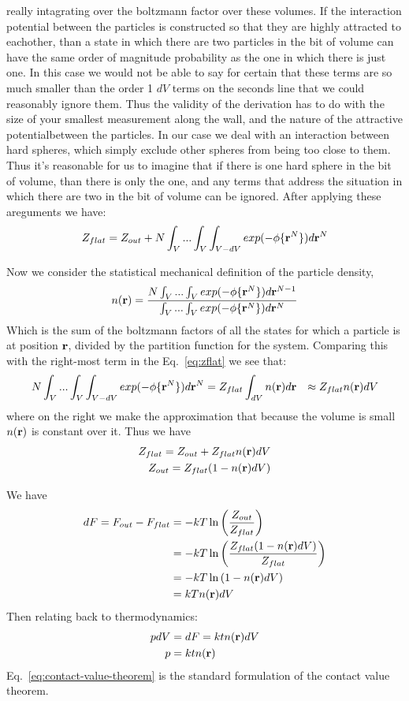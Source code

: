 really intagrating over the boltzmann factor over these volumes.  If
the interaction potential between the particles is constructed so that
they are highly attracted to eachother, than a state in which there
are two particles in the bit of volume can have the same order of
magnitude probability as the one in which there is just one.  In this
case we would not be able to say for certain that these terms are so
much smaller than the order 1 $dV$ terms on the seconds line that we
could reasonably ignore them. Thus the validity of the derivation has
to do with the size of your smallest measurement along the wall, and
the nature of the attractive potentialbetween the particles.  In our
case we deal with an interaction between hard spheres, which simply
exclude other spheres from being too close to them.  Thus it's
reasonable for us to imagine that if there is one hard sphere in the
bit of volume, than there is only the one, and any terms that address
the situation in which there are two in the bit of volume can be
ignored.  After applying these areguments we have:
\begin{align}
  \label{eq:zflat}
  Z_{flat} = Z_{out} + N \int_V... \int_V \int_{V-dV} exp(-\phi \{ \textbf{r}^N \})d\textbf{r}^N
\end{align}

Now we consider the statistical mechanical definition of the particle
density,
\begin{align}
  n(\textbf{r}) = \frac{N \int_V... \int_V exp(-\phi \{ \textbf{r}^N \})d\textbf{r}^{N-1}}{\int_V... \int_V exp(-\phi \{ \textbf{r}^N \})d\textbf{r}^N}
\end{align}
Which is the sum of the boltzmann factors of all the states for which
a particle is at position $\textbf{r}$, divided by the partition function for
the system.  Comparing this with the right-most term in the
Eq.~\ref{eq:zflat} we see that:
\begin{align}
 N \int_V... \int_V \int_{V-dV} exp(-\phi \{ \textbf{r}^N \})d\textbf{r}^N  &= Z_{flat} \int_{dV} n(\textbf{r}) d\textbf{r}
 &\approx Z_{flat} n(\textbf{r})dV
\end{align}
where on the right we make the approximation that because the volume
is small $n(\textbf{r})$ is constant over it.
Thus we have
\begin{align}
Z_{flat} = Z_{out} + Z_{flat} n(\textbf{r})dV \\
Z_{out} = Z_{flat} (1-n(\textbf{r})dV)
\end{align}

We have
\begin{align}
  dF = F_{out} - F_{flat} &= -kT \ln \left( \frac{Z_{out}}{Z_{flat}} \right) \notag \\
  &= -kT \ln \left( \frac{Z_{flat} (1-n(\textbf{r})dV)}{Z_{flat}} \right) \notag \\
  &= -kT \ln \left( 1-n(\textbf{r})dV \right) \notag \\
  &= kTn(\textbf{r})dV
\end{align}
Then relating back to thermodynamics:
\begin{align}
  pdV &= dF = ktn(\textbf{r})dV \\
  \label{eq:contact-value-theorem}
  p &= ktn(\textbf{r})
\end{align}
Eq.~\ref{eq:contact-value-theorem} is the standard formulation of the
contact value theorem.


